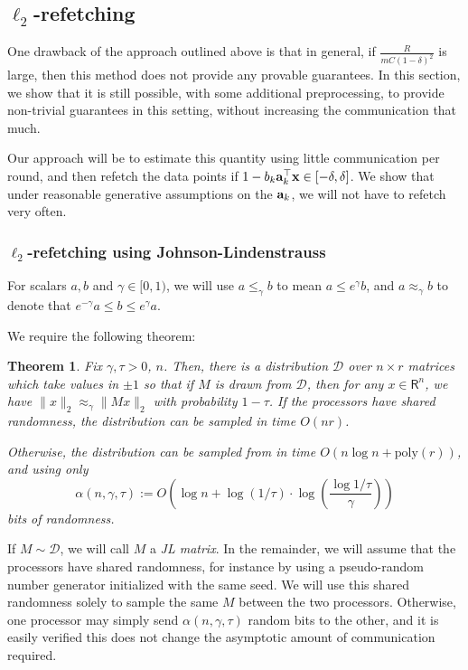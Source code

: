 \documentclass{article}
\newcommand{\R}{\mathsf{R}}
\newcommand{\poly}{\mathrm{poly}}
\def\a{{\bf a}}
\def\x{{\bf x}}
\newtheorem{theorem}{Theorem}
\begin{document}
\subsection{$\ell_2$-refetching}

One drawback of the approach outlined above is that in general, if $\frac{R}{m C (1 - \delta)^2}$ is large, then this method does not provide any provable guarantees.
In this section, we show that it is still possible, with some additional preprocessing, to provide non-trivial guarantees in this setting, without increasing the communication that much.

Our approach will be to estimate this quantity using little communication per round, and then refetch the data points if $1 - b_k \a_k^\top \x \in [-\delta, \delta]$.
We show that under reasonable generative assumptions on the $\a_k$, we will not have to refetch very often.

\subsubsection{$\ell_2$-refetching using Johnson-Lindenstrauss}
For scalars $a, b$ and $\gamma \in [0, 1)$, we will use $a \leq_\gamma b$ to mean $a \leq e^\gamma b$, and $a \approx_\gamma b$ to denote that $e^{-\gamma} a \leq b \leq e^\gamma a$.

We require the following theorem:
\begin{theorem}
\label{thm:JL}
Fix $\gamma, \tau > 0$, $n$.
Then, there is a distribution $\mathcal{D}$ over $n \times r$ matrices which take values in $\pm 1$ so that if $M$  is drawn from $\mathcal{D}$, then for any $x \in \R^n$, we have $\| x \|_2 \approx_\gamma \| M x \|_2$ with probability $1 - \tau$.
If the processors have shared randomness, the distribution can be sampled in time $O(n r)$.

Otherwise, the distribution can be sampled from in time $O(n \log n + \poly (r))$, and using only 
\[
\alpha (n, \gamma, \tau) := O \left( \log n + \log (1 / \tau) \cdot \log \left( \frac{\log 1 / \tau}{\gamma} \right) \right)
\]
bits of randomness.
\end{theorem}
\noindent
If $M \sim \mathcal{D}$, we will call $M$ a \emph{JL matrix}.
In the remainder, we will assume that the processors have shared randomness, for instance by using a pseudo-random number generator initialized with the same seed.
We will use this shared randomness solely to sample the same $M$ between the two processors.
Otherwise, one processor may simply send $\alpha (n, \gamma, \tau)$ random bits to the other, and it is easily verified this does not change the asymptotic amount of communication required.
\end{document}
